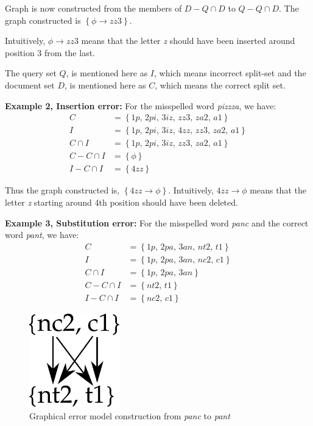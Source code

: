 	Graph is now constructed from the members of $D - Q \cap D$ to $Q - Q \cap D$.
	The graph constructed is $\left\lbrace \phi \rightarrow \textit{zz3} \right\rbrace$.
	
	Intuitively, $\phi \rightarrow \textit{zz3}$ means that the letter \textit{z} should have been inserted around position 3 from the last.
	
	The query set $Q$, is mentioned here as $I$, which means incorrect split-set and the document set $D$, is mentioned here as $C$, which means the correct split set.
	
	\textbf{Example 2, Insertion error:} For the misspelled word \textit{pizzza}, we have:
	\begin{equation*}
	\begin{aligned}
	C &= \left\lbrace \textit{1p, 2pi, 3iz, zz3, za2, a1} \right\rbrace \\
	I &= \left\lbrace \textit{1p, 2pi, 3iz, 4zz, zz3, za2, a1} \right\rbrace \\
	C \cap I &= \left\lbrace \textit{1p, 2pi, 3iz, zz3, za2, a1} \right\rbrace \\
	C - C \cap I &= \left\lbrace \phi \right\rbrace \\
	I - C \cap I &= \left\lbrace \textit{4zz} \right\rbrace 
	\end{aligned}
	\end{equation*}
	
	Thus the graph constructed is, $\left\lbrace \textit{4zz} \rightarrow  \phi \right\rbrace$.
	Intuitively, $\textit{4zz} \rightarrow  \phi$ means that the letter \textit{z} starting around 4th position should have been deleted.
	
	\textbf{Example 3, Substitution error:} For the misspelled word \textit{panc} and the correct word \textit{pant}, we have:
	\begin{equation*}
	\begin{aligned}
	C &= \left\lbrace \textit{1p, 2pa, 3an, nt2, t1} \right\rbrace \\
	I &= \left\lbrace \textit{1p, 2pa, 3an, nc2, c1} \right\rbrace \\
	C \cap I &= \left\lbrace \textit{1p, 2pa, 3an} \right\rbrace \\
	C - C \cap I &= \left\lbrace \textit{nt2, t1} \right\rbrace \\
	I - C \cap I &= \left\lbrace \textit{nc2, c1} \right\rbrace
	\end{aligned}
	\end{equation*}
	\begin{figure}[h]
		\centering
		\includegraphics[width=0.35\textwidth]{gfx/ex3.pdf}
		\caption{Graphical error model construction from \textit{panc} to \textit{pant}}
		\label{e3}
	\end{figure}
	
